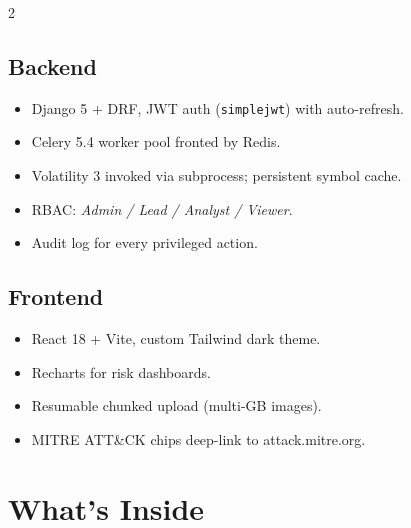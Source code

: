 \documentclass[11pt,a4paper]{article}
\begin{document}
\begin{multicols}{2}
\subsection*{Backend}
\begin{itemize}[leftmargin=1.2em,itemsep=1pt]
  \item Django 5 + DRF, JWT auth (\texttt{simplejwt}) with auto-refresh.
  \item Celery 5.4 worker pool fronted by Redis.
  \item Volatility 3 invoked via subprocess; persistent symbol cache.
  \item RBAC: \emph{Admin / Lead / Analyst / Viewer}.
  \item Audit log for every privileged action.
\end{itemize}

\subsection*{Frontend}
\begin{itemize}[leftmargin=1.2em,itemsep=1pt]
  \item React 18 + Vite, custom Tailwind dark theme.
  \item Recharts for risk dashboards.
  \item Resumable chunked upload (multi-GB images).
  \item MITRE ATT\&CK chips deep-link to attack.mitre.org.
\end{itemize}
\end{multicols}

\section{What's Inside}
\end{document}
